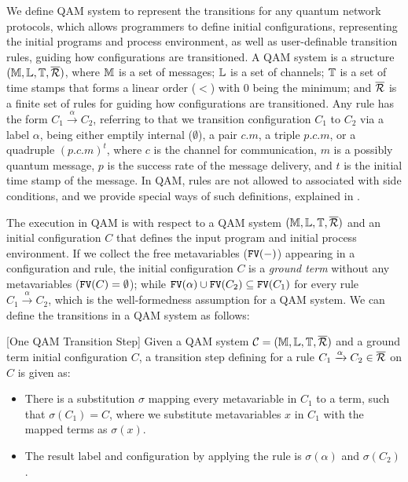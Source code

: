 We define QAM system to represent the transitions for any quantum network protocols, which allows programmers to define initial configurations, representing the initial programs and process environment, as well as user-definable transition rules, guiding how configurations are transitioned. A QAM system is a structure $(\mathbb{M},\mathbb{L},\mathbb{T},\overline{\mathcal{R}})$,
where $\mathbb{M}$ is a set of messages;
$\mathbb{L}$ is a set of channels;
$\mathbb{T}$ is a set of time stamps that forms a linear order ($<$) with $0$ being the minimum;
and $\overline{\mathcal{R}}$ is a finite set of rules for guiding how configurations are transitioned. 
Any rule has the form $C_1 \xrightarrow{\alpha} C_2$, referring to that we transition configuration $C_1$ to $C_2$ via a label $\alpha$, being either emptily internal ($\emptyset$), a pair $c.m$, a triple $p.c.m$, or a quadruple $(p.c.m)^t$, where $c$ is the channel for communication, $m$ is a possibly quantum message, $p$ is the success rate of the message delivery, and $t$ is the initial time stamp of the message. In QAM, rules are not allowed to associated with side conditions, and we provide special ways of such definitions, explained in .

The execution in QAM is with respect to a QAM system $(\mathbb{M},\mathbb{L},\mathbb{T},\overline{\mathcal{R}})$ and an initial configuration $C$ that defines the input program and initial process environment.
If we collect the free metavariables ($\texttt{FV}(-)$) appearing in a configuration and rule, 
the initial configuration $C$ is a \textit{ground term} without any metavariables ($\texttt{FV}(C)=\emptyset$);
while $\texttt{FV}(\alpha) \cup \texttt{FV}(C_2)\subseteq \texttt{FV}(C_1)$ for every rule $C_1 \xrightarrow{\alpha} C_2$, which is the well-formedness assumption for a QAM system.
We can define the transitions in a QAM system as follows:

\begin{definition}\label{def:labeledsystem}\rm[One QAM Transition Step]
Given a QAM system $\mathcal{C}=(\mathbb{M},\mathbb{L},\mathbb{T},\overline{\mathcal{R}})$ and a ground term initial configuration $C$, a transition step defining for a rule $C_1 \xrightarrow{\alpha} C_2 \in \overline{\mathcal{R}}$ on $C$ is given as:
\begin{itemize}
\item There is a substitution $\sigma$ mapping every metavariable in $C_1$ to a term, such that $\sigma(C_1)=C$, where we substitute metavariables $x$ in $C_1$ with the mapped terms as $\sigma(x)$.
\item The result label and configuration by applying the rule is $\sigma(\alpha)$ and $\sigma(C_2)$.
\end{itemize}
\end{definition}


